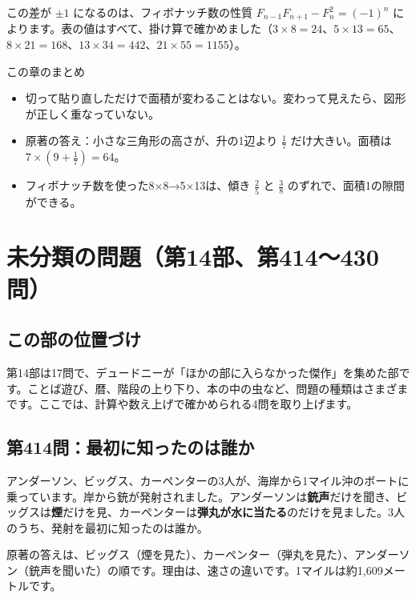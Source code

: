 \documentclass[a4paper,11pt,openany]{ltjsbook}
\begin{document}
この差が $\pm1$ になるのは、フィボナッチ数の性質 $F_{n-1}F_{n+1}-F_n^2=(-1)^n$ によります。表の値はすべて、掛け算で確かめました（$3\times8=24$、$5\times13=65$、$8\times21=168$、$13\times34=442$、$21\times55=1155$）。

\begin{pointbox}{この章のまとめ}
\begin{itemize}[leftmargin=*]
\item 切って貼り直しただけで面積が変わることはない。変わって見えたら、図形が正しく重なっていない。
\item 原著の答え：小さな三角形の高さが、升の1辺より $\tfrac17$ だけ大きい。面積は $7\times(9+\tfrac17)=64$。
\item フィボナッチ数を使った8×8→5×13は、傾き $\tfrac25$ と $\tfrac38$ のずれで、面積1の隙間ができる。
\end{itemize}
\end{pointbox}

\chapter{未分類の問題（第14部、第414〜430問）}

\section{この部の位置づけ}

第14部は17問で、デュードニーが「ほかの部に入らなかった傑作」を集めた部です。ことば遊び、暦、階段の上り下り、本の中の虫など、問題の種類はさまざまです。ここでは、計算や数え上げで確かめられる4問を取り上げます。

\section{第414問：最初に知ったのは誰か}

アンダーソン、ビッグス、カーペンターの3人が、海岸から1マイル沖のボートに乗っています。岸から銃が発射されました。アンダーソンは\textbf{銃声}だけを聞き、ビッグスは\textbf{煙}だけを見、カーペンターは\textbf{弾丸が水に当たる}のだけを見ました。3人のうち、発射を最初に知ったのは誰か。

原著の答えは、ビッグス（煙を見た）、カーペンター（弾丸を見た）、アンダーソン（銃声を聞いた）の順です。理由は、速さの違いです。1マイルは約1,609メートルです。
\end{document}
